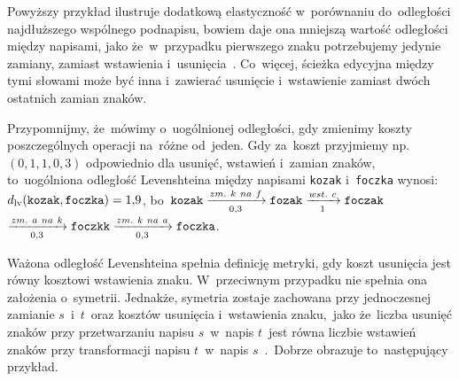 \documentclass{praca1}
\begin{document}
Powyższy przykład ilustruje dodatkową elastyczność w~porównaniu do~odległości najdłuższego wspólnego podnapisu, bowiem daje ona mniejszą wartość odległości między napisami, jako że~w~przypadku pierwszego znaku potrzebujemy jedynie zamiany, zamiast wstawienia i~usunięcia~\cite{Loo2014:stringdist}. Co~więcej, ścieżka edycyjna między tymi słowami może być inna i~zawierać usunięcie i~wstawienie zamiast dwóch ostatnich zamian znaków.


Przypomnijmy, że~mówimy o~uogólnionej odległości, gdy zmienimy koszty poszczególnych operacji na~różne od~jeden.
Gdy za~koszt przyjmiemy np. $(0{,}1, 1, 0{,}3)$ odpowiednio dla usunięć, wstawień i~zamian znaków, to~uogólniona odległość Levenshteina między napisami \verb|kozak| i~\verb|foczka| wynosi: $d_{\mathrm{lv}}(\verb|kozak|, \verb|foczka|) = 1{,}9$, bo~$\verb|kozak|  \xrightarrow[0{,}3]{zm.\ k\ na\ f} \verb|fozak| \xrightarrow[1]{wst.\ c} \verb|foczak|$ $\xrightarrow[0{,}3]{zm.\ a\ na\ k} \verb|foczkk| \xrightarrow[0{,}3]{zm.\ k\ na\ a} \verb|foczka|$.

Ważona odległość Levenshteina spełnia definicję metryki, gdy koszt usunięcia jest równy kosztowi wstawienia znaku. W~przeciwnym przypadku nie spełnia ona założenia o~symetrii. Jednakże, symetria zostaje zachowana przy jednoczesnej zamianie $s$~i~$t$~oraz kosztów usunięcia i~wstawienia znaku,~jako że~liczba usunięć znaków przy przetwarzaniu napisu $s$~w~napis $t$~jest równa liczbie wstawień znaków przy transformacji napisu $t$~w~napis $s$~\cite{Loo2014:stringdist}.~Dobrze obrazuje to~następujący przykład.
\end{document}
